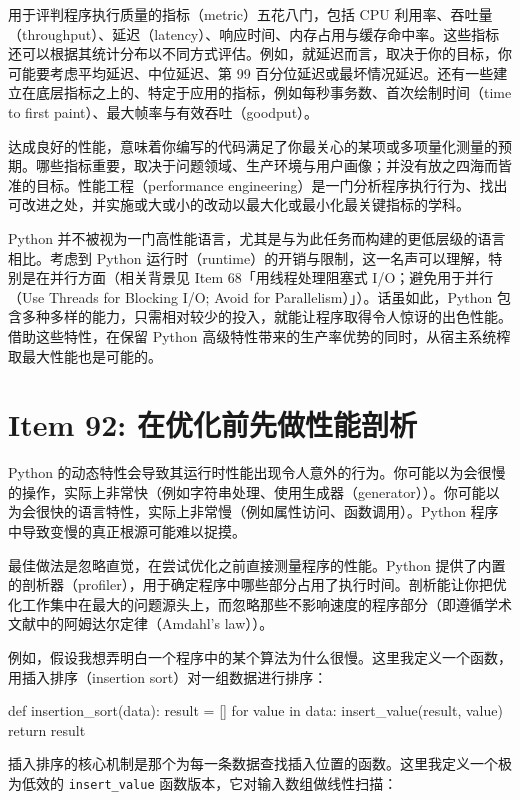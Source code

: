 用于评判程序执行质量的指标（metric）五花八门，包括 CPU 利用率、吞吐量（throughput）、延迟（latency）、响应时间、内存占用与缓存命中率。这些指标还可以根据其统计分布以不同方式评估。例如，就延迟而言，取决于你的目标，你可能要考虑平均延迟、中位延迟、第 99 百分位延迟或最坏情况延迟。还有一些建立在底层指标之上的、特定于应用的指标，例如每秒事务数、首次绘制时间（time to first paint）、最大帧率与有效吞吐（goodput）。

达成良好的性能，意味着你编写的代码满足了你最关心的某项或多项量化测量的预期。哪些指标重要，取决于问题领域、生产环境与用户画像；并没有放之四海而皆准的目标。性能工程（performance engineering）是一门分析程序执行行为、找出可改进之处，并实施或大或小的改动以最大化或最小化最关键指标的学科。

Python 并不被视为一门高性能语言，尤其是与为此任务而构建的更低层级的语言相比。考虑到 Python 运行时（runtime）的开销与限制，这一名声可以理解，特别是在并行方面（相关背景见 Item 68「用线程处理阻塞式 I/O；避免用于并行（Use Threads for Blocking I/O; Avoid for Parallelism）」）。话虽如此，Python 包含多种多样的能力，只需相对较少的投入，就能让程序取得令人惊讶的出色性能。借助这些特性，在保留 Python 高级特性带来的生产率优势的同时，从宿主系统榨取最大性能也是可能的。

\section{Item 92: 在优化前先做性能剖析}

Python 的动态特性会导致其运行时性能出现令人意外的行为。你可能以为会很慢的操作，实际上非常快（例如字符串处理、使用生成器（generator））。你可能以为会很快的语言特性，实际上非常慢（例如属性访问、函数调用）。Python 程序中导致变慢的真正根源可能难以捉摸。

最佳做法是忽略直觉，在尝试优化之前直接测量程序的性能。Python 提供了内置的剖析器（profiler），用于确定程序中哪些部分占用了执行时间。剖析能让你把优化工作集中在最大的问题源头上，而忽略那些不影响速度的程序部分（即遵循学术文献中的阿姆达尔定律（Amdahl's law））。

例如，假设我想弄明白一个程序中的某个算法为什么很慢。这里我定义一个函数，用插入排序（insertion sort）对一组数据进行排序：

\begin{codebox}[python]
def insertion_sort(data):
    result = []
    for value in data:
        insert_value(result, value)
    return result
\end{codebox}

插入排序的核心机制是那个为每一条数据查找插入位置的函数。这里我定义一个极为低效的 \texttt{insert\_value} 函数版本，它对输入数组做线性扫描：

